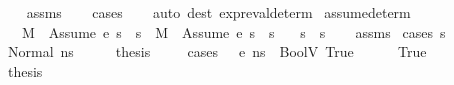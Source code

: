 \begin{isabellebody}
%
\isadelimproof
\ \ %
\endisadelimproof
%
\isatagproof
{}\isamarkupfalse%
\ assms\isanewline
\ \ \isamarkupfalse%
\ cases\isanewline
\ \ \isamarkupfalse%
\ {\isacharparenleft}{\kern0pt}auto\ dest{\isacharcolon}{\kern0pt}\ expr{\isacharunderscore}{\kern0pt}eval{\isacharunderscore}{\kern0pt}determ{\isacharparenleft}{\kern0pt}{}{\isacharparenright}{\kern0pt}{\isacharparenright}{\kern0pt}%
\endisatagproof
{\isafoldproof}%
%
\isadelimproof
\isanewline
%
\endisadelimproof
\isanewline
{}\isamarkupfalse%
\ assume{\isacharunderscore}{\kern0pt}determ{\isacharcolon}{\kern0pt}\isanewline
\ \ \ {\isachardoublequoteopen}M{\isacharcomma}{\kern0pt}{\isasymLambda}{\isacharcomma}{\kern0pt}{\isasymGamma}{\isacharcomma}{\kern0pt}{\isasymOmega}\ {\isasymturnstile}\ {\isasymlangle}Assume\ e{\isacharcomma}{\kern0pt}\ s{}{\isasymrangle}\ {\isasymrightarrow}\ s{}{\isachardoublequoteclose}\ \ {\isachardoublequoteopen}M{\isacharcomma}{\kern0pt}{\isasymLambda}{\isacharcomma}{\kern0pt}{\isasymGamma}{\isacharcomma}{\kern0pt}{\isasymOmega}\ {\isasymturnstile}\ {\isasymlangle}Assume\ e{\isacharcomma}{\kern0pt}\ s{}{\isasymrangle}\ {\isasymrightarrow}\ s{}{\isachardoublequoteclose}\isanewline
\ \ \ {\isachardoublequoteopen}s{}\ {\isacharequal}{\kern0pt}\ s{}{\isachardoublequoteclose}\isanewline
%
\isadelimproof
\ \ %
\endisadelimproof
%
\isatagproof
{}\isamarkupfalse%
\ assms\isanewline
{}\isamarkupfalse%
\ {\isacharparenleft}{\kern0pt}cases\ s{}{\isacharparenright}{\kern0pt}\isanewline
\ \ \isamarkupfalse%
\ {\isacharparenleft}{\kern0pt}Normal\ ns{\isacharparenright}{\kern0pt}\isanewline
\ \ \isamarkupfalse%
\ \isamarkupfalse%
\ {\isacharquery}{\kern0pt}thesis\ \isanewline
\ \ \isamarkupfalse%
\ {\isacharparenleft}{\kern0pt}cases\ {\isachardoublequoteopen}{\isasymLambda}{\isacharcomma}{\kern0pt}{\isasymGamma}{\isacharcomma}{\kern0pt}{\isasymOmega}\ {\isasymturnstile}\ {\isasymlangle}e{\isacharcomma}{\kern0pt}\ ns{\isasymrangle}\ {\isasymDown}\ BoolV\ True{\isachardoublequoteclose}{\isacharparenright}{\kern0pt}\isanewline
\ \ \ \ \isamarkupfalse%
\ True\isanewline
\ \ \ \ \isamarkupfalse%
\ \isamarkupfalse%
\ {\isacharquery}{\kern0pt}thesis\ \isamarkupfalse%

\end{isabellebody}
